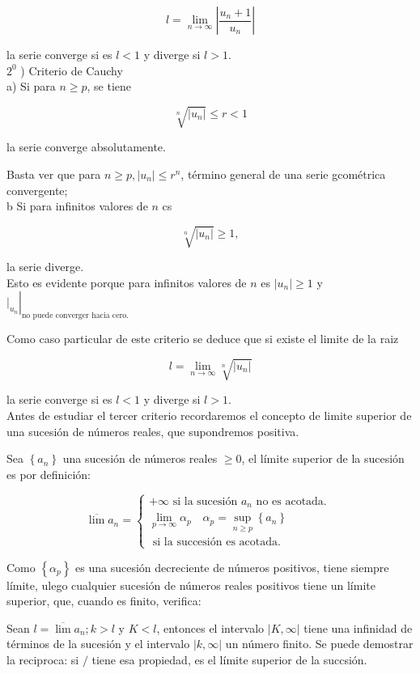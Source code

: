 \documentclass[10pt]{article}
\theoremstyle{plain}
\theoremstyle{definition}
\theoremstyle{remark}
\begin{document}
$$
l=\lim _{n \rightarrow \infty}\left|\frac{u_{n}+1}{u_{n}}\right|
$$

la serie converge si es $l<1$ y diverge si $l>1$.\\
$2^{0}$ ) Criterio de Cauchy\\
a) Si para $n \geqslant p$, se tiene

$$
\sqrt[n]{\left|u_{n}\right|} \leqslant r<1
$$

la serie converge absolutamente.

Basta ver que para $n \geqslant p,\left|u_{n}\right| \leqslant r^{n}$, término general de una serie gcométrica convergente;\\
b Si para infinitos valores de $n$ cs

$$
\sqrt[n]{\left|u_{n}\right|} \geqslant 1,
$$

la serie diverge.\\
Esto es evidente porque para infinitos valores de $n$ es $\left|u_{n}\right| \geqslant 1$ y $\left.\left.\right|_{u_{n}}\right|_{\text {no puede converger hacia cero. }}$

Como caso particular de este criterio se deduce que si existe el limite de la raiz

$$
l=\lim _{n \rightarrow \infty} \sqrt[n]{\left|u_{n}\right|}
$$

la serie converge si es $l<1$ y diverge si $l>1$.\\
Antes de estudiar el tercer criterio recordaremos el concepto de limite superior de una sucesión de números reales, que supondremos positiva.

Sea $\left\{a_{n}\right\}$ una sucesión de números reales $\geqslant 0$, el límite superior de la sucesión es por definición:

$$
\overline{\lim } a_{n}=\left\{\begin{array}{l}
+\infty \text { si la sucesión } a_{n} \text { no es acotada. } \\
\lim _{p \rightarrow \infty} \alpha_{p} \quad \alpha_{p}=\sup _{n \geqslant p}\left\{a_{n}\right\} \\
\text { si la succesión es acotada. }
\end{array}\right.
$$

Como $\left\{\alpha_{p}\right\}$ es una sucesión decreciente de números positivos, tiene siempre límite, ulego cualquier sucesión de números reales positivos tiene un límite superior, que, cuando es finito, verifica:

Sean $l=\overline{\lim } a_{n} ; k>l$ y $K<l$, entonces el intervalo $|K, \infty|$ tiene una infinidad de términos de la sucesión y el intervalo $|k, \infty|$ un número finito. Se puede demostrar la reciproca: si $/$ tiene esa propiedad, es el límite superior de la succsión.
\end{document}
